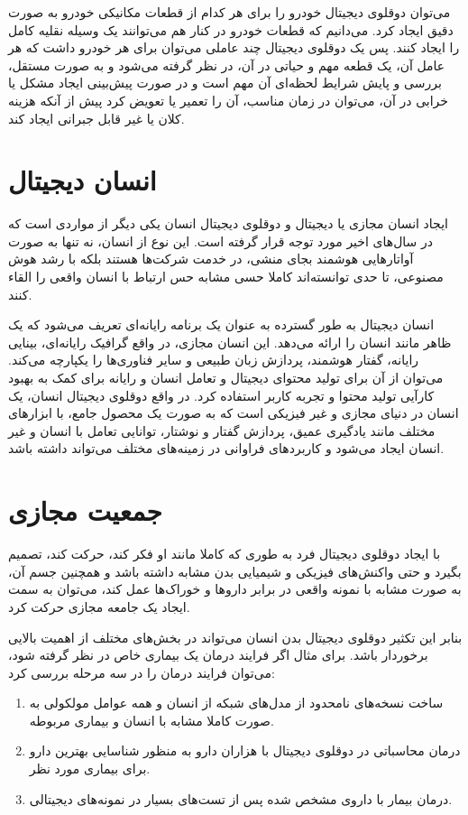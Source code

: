 می‌توان دوقلوی دیجیتال خودرو را برای هر کدام از قطعات مکانیکی خودرو به صورت دقیق ایجاد کرد. می‌دانیم که قطعات خودرو در کنار هم می‌توانند یک وسیله نقلیه کامل را ایجاد کنند. پس یک دوقلوی دیجیتال چند عاملی می‌توان برای هر خودرو داشت که هر عامل آن، یک قطعه مهم و حیاتی در آن، در نظر گرفته می‌شود و به صورت مستقل، بررسی و پایش شرایط لحظه‌ای آن مهم است و در صورت پیش‌بینی ایجاد مشکل یا خرابی در آن، می‌توان در زمان مناسب، آن را تعمیر یا تعویض کرد پیش از آنکه هزینه کلان یا غیر قابل جبرانی ایجاد کند.

\section{انسان دیجیتال}
ایجاد انسان مجازی یا دیجیتال و دوقلوی دیجیتال انسان 
یکی دیگر از مواردی است که در سال‌های اخیر مورد توجه قرار گرفته است. این نوع از انسان، نه تنها به صورت آواتارهایی هوشمند بجای منشی، در خدمت شرکت‌ها هستند بلکه با رشد هوش مصنوعی، تا حدی توانسته‌اند کاملا حسی مشابه حس ارتباط با انسان واقعی را القاء کنند.

انسان دیجیتال به طور گسترده به عنوان یک برنامه رایانه‌ای تعریف می‌شود که یک ظاهر مانند انسان را ارائه می‌دهد. این انسان مجازی، در واقع گرافیک رایانه‌ای، بینایی رایانه، گفتار هوشمند، پردازش زبان طبیعی و سایر فناوری‌ها را یکپارچه می‌کند. می‌توان از آن برای تولید محتوای دیجیتال و تعامل انسان و رایانه برای کمک به بهبود کارآیی تولید محتوا و تجربه کاربر استفاده کرد. در واقع دوقلوی دیجیتال انسان، یک انسان در دنیای مجازی و غیر فیزیکی است که به صورت یک محصول جامع، با ابزار‌های مختلف مانند یادگیری عمیق،‌ پردازش گفتار و نوشتار، توانایی تعامل با انسان و غیر انسان ایجاد می‌شود و کاربرد‌های فراوانی در زمینه‌های مختلف می‌تواند داشته باشد.

\section{جمعیت مجازی}
با ایجاد دوقلوی دیجیتال فرد به طوری که کاملا مانند او فکر کند، حرکت کند، تصمیم بگیرد و حتی واکنش‌های فیزیکی و شیمیایی بدن مشابه داشته باشد و همچنین جسم آن، به صورت مشابه با نمونه واقعی در برابر دارو‌ها و خوراک‌ها عمل کند، می‌توان به سمت ایجاد یک جامعه مجازی حرکت کرد.

بنابر این تکثیر دوقلوی دیجیتال بدن انسان می‌تواند در بخش‌های مختلف از اهمیت بالایی برخوردار باشد. برای مثال اگر فرایند درمان یک بیماری خاص در نظر گرفته شود، می‌توان فرایند درمان را در سه مرحله بررسی کرد:
\begin{enumerate}
	\item 
ساخت نسخه‌های نامحدود از مدل‌های شبکه از انسان و همه عوامل مولکولی به صورت کاملا مشابه با انسان و بیماری مربوطه.
	\item 
درمان محاسباتی در دوقلوی دیجیتال با هزاران دارو به منظور شناسایی بهترین دارو برای بیماری مورد نظر.
	\item 
درمان بیمار با داروی مشخص شده پس از تست‌های بسیار در نمونه‌های دیجیتالی.
\end{enumerate}

